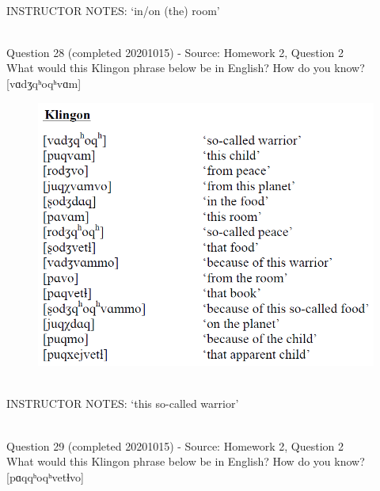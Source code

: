 \documentclass[12pt]{article}
\begin{document}
~\\
INSTRUCTOR NOTES: ‘in/on (the) room’


~\\

{\large Question 28} (completed 20201015) - Source: Homework 2, Question 2\\

What would this Klingon phrase below be in English? How do you know?\\

{[vɑdʒqʰoqʰvɑm]}

\begin{figure}[H]
\includegraphics{../images/klingon.png}
\end{figure}

~\\
INSTRUCTOR NOTES: ‘this so-called warrior’


~\\

{\large Question 29} (completed 20201015) - Source: Homework 2, Question 2\\

What would this Klingon phrase below be in English? How do you know?\\

{[pɑqqʰoqʰvetɬvo]}
\end{document}
